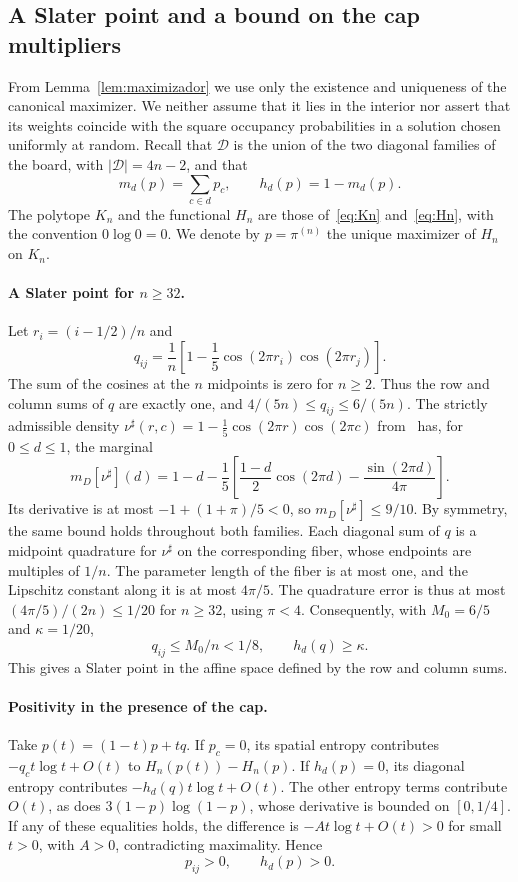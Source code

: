 \subsection{A Slater point and a bound on the cap multipliers}\label{sec:P01}
From Lemma~\ref{lem:maximizador} we use only the existence and uniqueness of the canonical maximizer.
We neither assume that it lies in the interior nor assert that its weights coincide with the square
occupancy probabilities in a solution chosen uniformly at random.
Recall that $\mathcal D$ is the union of the two diagonal families of the board,
with $|\mathcal D|=4n-2$, and that
\[
 m_d(p)=\sum_{c\in d}p_c,\qquad h_d(p)=1-m_d(p).
\]
The polytope $K_n$ and the functional $H_n$ are those of~\eqref{eq:Kn} and~\eqref{eq:Hn}, with the
convention
$0\log0=0$. We denote by $p=\pi^{(n)}$ the unique maximizer of $H_n$ on $K_n$.

\paragraph{A Slater point for $n\ge32$.}
Let $r_i=(i-1/2)/n$ and
\[
 q_{ij}=\frac1n\left[1-\frac15\cos(2\pi r_i)\cos(2\pi r_j)\right].
\]
The sum of the cosines at the $n$ midpoints is zero for $n\ge2$.
Thus the row and column sums of $q$ are exactly one, and
$4/(5n)\le q_{ij}\le6/(5n)$.
The strictly admissible density $\nu^\sharp(r,c)=1-\frac15\cos(2\pi r)\cos(2\pi c)$
from~\cite[Remark~2.4]{Perfil} has, for $0\le d\le1$, the marginal
\[
 m_D[\nu^\sharp](d)=1-d-\frac15\left[
       \frac{1-d}{2}\cos(2\pi d)-\frac{\sin(2\pi d)}{4\pi}\right].
\]
Its derivative is at most $-1+(1+\pi)/5<0$, so $m_D[\nu^\sharp]\le9/10$.
By symmetry, the same bound holds throughout both families.
Each diagonal sum of $q$ is a midpoint quadrature for
$\nu^\sharp$ on the corresponding fiber, whose endpoints are multiples of $1/n$.
The parameter length of the fiber is at most one, and the Lipschitz constant along it
is at most $4\pi/5$. The quadrature error is thus
at most $(4\pi/5)/(2n)\le1/20$ for $n\ge32$, using $\pi<4$.
Consequently, with $M_0=6/5$ and $\kappa=1/20$,
\[
 q_{ij}\le M_0/n<1/8,\qquad h_d(q)\ge\kappa.       \tag{P1.1}
\]
This gives a Slater point in the affine space defined by the row and column sums.

\paragraph{Positivity in the presence of the cap.}
Take $p(t)=(1-t)p+tq$. If $p_c=0$, its spatial entropy contributes
$-q_c t\log t+O(t)$ to $H_n(p(t))-H_n(p)$. If $h_d(p)=0$, its
diagonal entropy contributes $-h_d(q)t\log t+O(t)$. The other entropy terms
contribute $O(t)$, as does $3(1-p)\log(1-p)$, whose derivative
is bounded on $[0,1/4]$. If any of these equalities holds, the
difference is $-At\log t+O(t)>0$ for small $t>0$, with $A>0$,
contradicting maximality. Hence
\[
 p_{ij}>0,\qquad h_d(p)>0.                         \tag{P1.2}
\]

